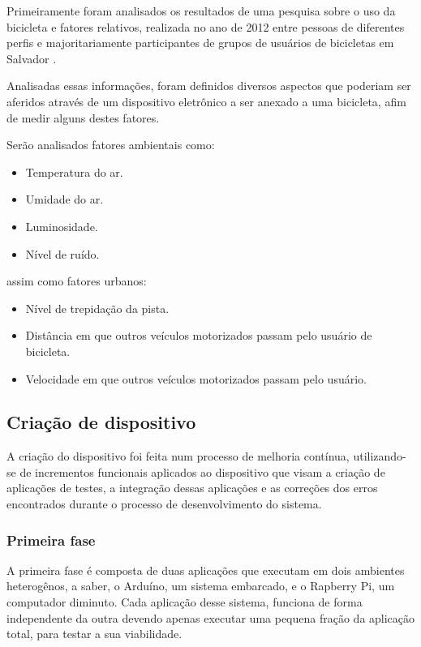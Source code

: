 \documentclass[final,12pt, times, 5p, twocolumn]{elsarticle}
\begin{document}
Primeiramente foram analisados os resultados de uma pesquisa sobre o uso da bicicleta  e fatores relativos, realizada no ano de 2012 entre pessoas de diferentes perfis e majoritariamente participantes de grupos de usuários de bicicletas em Salvador \cite{pesquisamobilidade}.

Analisadas essas informações, foram definidos diversos aspectos que poderiam ser aferidos através de um dispositivo eletrônico a ser anexado a uma bicicleta, afim de medir alguns destes fatores.

Serão analisados fatores ambientais como:

\begin{itemize}

  \item Temperatura do ar.
  \item Umidade do ar.
  \item Luminosidade.
  \item Nível de ruído.

\end{itemize}

assim como fatores urbanos:

\begin{itemize}

  \item Nível de trepidação da pista.
  \item Distância em que outros veículos motorizados passam pelo usuário de bicicleta.
  \item Velocidade em que outros veículos motorizados passam pelo usuário.

\end{itemize}

\subsection{Criação de dispositivo}

A criação do dispositivo foi feita num processo de melhoria contínua, utilizando-se de incrementos funcionais aplicados ao dispositivo que visam a criação de aplicações de testes, a integração dessas aplicações e as correções dos erros encontrados durante o processo de desenvolvimento do sistema.

\subsubsection{Primeira fase}

A primeira fase é composta de duas aplicações que executam em dois ambientes heterogênos, a saber, o Arduíno, um sistema embarcado, e o Rapberry Pi, um computador diminuto. Cada aplicação desse sistema, funciona de forma independente da outra devendo apenas executar uma pequena fração da aplicação total, para testar a sua viabilidade.
\end{document}
